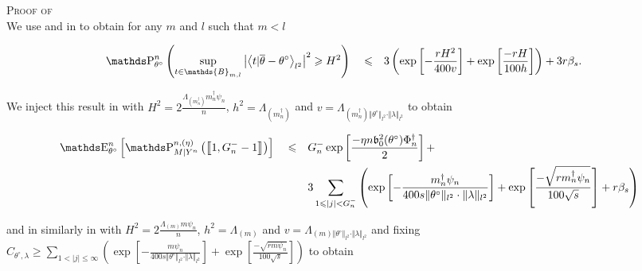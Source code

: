 \begin{pro}{\textsc{Proof of } \\}\label{PROD.5.7}
We use  and  in  to obtain for any $m$ and $l$ such that $m < l$

\begin{alignat*}{3}
& \P_{\theta^{\circ}}^{n}\left(\sup\limits_{t \in \mathds{B}_{m, l}} \left\vert \left\langle t \vert \overline{\theta} - \theta^{\circ}\right\rangle_{l^{2}} \right\vert^{2} \geq H^{2} \right) && \leq && 3 \left(\exp\left[- \frac{r H^{2}}{400 v}\right] + \exp\left[ \frac{-r H}{100 h}\right]\right) + 3 r\beta_{s}.
\end{alignat*}

We inject this result in  with $H^{2} = 2 \frac{\Lambda_{(m^{\dagger}_{n})} m^{\dagger}_{n} \psi_{n}}{n}$, $h^{2} = \Lambda_{(m^{\dagger}_{n})}$ and $v = \Lambda_{(m^{\dagger}_{n}) \Vert \theta^{\circ} \Vert_{l^{2}} \cdot \Vert \lambda \Vert_{l^{2}}}$ to obtain

\begin{alignat}{3}
& \E_{\theta^{\circ}}^{n}\left[\P_{M \vert Y^{n}}^{n, (\eta)}\left(\left\llbracket 1, G^{-}_{n} - 1 \right\rrbracket\right)\right] && \leq && G^{-}_{n}\exp\left[\frac{- \eta n \mathfrak{b}_{0}^{2}(\theta^{\circ}) \Phi^{\dagger}_{n}}{2}\right] +\notag\\
& && && 3 \sum\limits_{1 \leq \vert j \vert < G^{-}_{n}}\left(\exp\left[- \frac{m^{\dagger}_{n} \psi_{n}}{400 s \Vert \theta^{\circ} \Vert_{l^{2}} \cdot \Vert \lambda \Vert_{l^{2}}}\right] + \exp\left[ \frac{- \sqrt{r m^{\dagger}_{n} \psi_{n}}}{100\sqrt{s}}\right] + r\beta_{s}\right)\label{EQD.42}
\end{alignat}

and in similarly in  with $H^{2} = 2 \frac{\Lambda_{(m)} m \psi_{n}}{n}$, $h^{2} = \Lambda_{(m)}$ and $v = \Lambda_{(m) \Vert \theta^{\circ} \Vert_{l^{2}} \cdot \Vert \lambda \Vert_{l^{2}}}$ and fixing $C_{\theta^{\circ}, \lambda} \geq  \sum\limits_{1 < \vert j \vert \leq \infty} \left(\exp\left[- \frac{m \psi_{n}}{400 s \Vert \theta^{\circ} \Vert_{l^{2}} \cdot \Vert \lambda \Vert_{l^{2}}}\right] + \exp\left[ \frac{- \sqrt{r m \psi_{n}}}{100 \sqrt{s}}\right]\right)$ to obtain


\end{pro}
